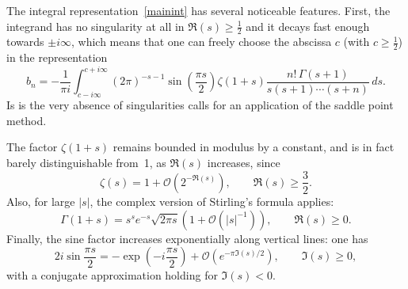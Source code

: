 \documentclass{amsart}
\begin{document}
The integral representation~\eqref{mainint} has several noticeable features. 
First, the integrand has no singularity at all in $\Re(s)\ge\frac12$
and it decays fast enough towards $\pm i \infty$,
which means that one can freely choose the abscissa $c$ (with $c\geq\frac12$)
in the representation 
\begin{equation}\label{mainint2}
b_n = -\frac{1}{\pi i} 
\int_{c-i\infty}^{c+i\infty} 
(2\pi)^{-s-1} \sin\left(\frac{\pi s}{2}\right)\zeta(1+s)
\frac{n!\, \Gamma(s+1)}{s(s+1)\cdots(s+n)}\, ds.
\end{equation}
Is is the very absence of singularities calls for an application 
of the saddle  point method.

The factor $\zeta(1+s)$ remains bounded in modulus by a constant,
and is in fact barely distinguishable from~1, as $\Re(s)$ increases,
since
\begin{equation}\label{zetapp}
\zeta(s)=1+\mathcal{O}\left(2^{-\Re(s)}\right), \qquad \Re(s)\ge\frac32.
\end{equation}
Also, for large $|s|$, the complex version of Stirling's formula 
applies:
\begin{equation}\label{stirapp}
\Gamma(1+s) = s^s e^{-s}\sqrt{2\pi s}\left(1+\mathcal{O}(|s|^{-1})\right),\qquad \Re(s)\ge0.
\end{equation}
Finally, the sine factor increases exponentially along vertical lines:
one has
\begin{equation}\label{sinapp}
2i\sin\frac{\pi s}{2} =-\exp\left(-i\frac{\pi s}{2}\right)
+\mathcal{O}\left(e^{-\pi \Im(s)/2}\right), \qquad \Im(s)\ge0,
\end{equation}
with a conjugate approximation holding for $\Im(s)<0$.
\end{document}
